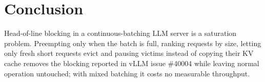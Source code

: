 \documentclass[11pt]{article}
\begin{document}
\section{Conclusion}

Head-of-line blocking in a continuous-batching LLM server is a saturation problem. Preempting only
when the batch is full, ranking requests by size, letting only fresh short requests evict and pausing
victims instead of copying their KV cache removes the blocking reported in vLLM issue \#40004 while
leaving normal operation untouched; with mixed batching it costs no measurable throughput.

\end{document}
